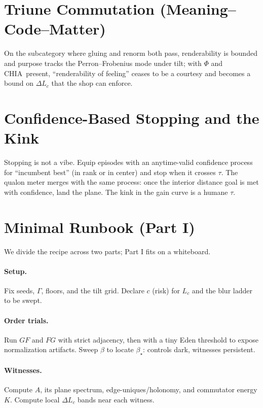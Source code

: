 \documentclass[11pt]{article}
\newcommand{\1}{\mathbf{1}}
\newcommand{\Guard}{\Gamma}
\newcommand{\Blur}{\beta}
\newcommand{\Lc}{L_c}
\newcommand{\Fop}{F}
\newcommand{\Gop}{G}
\newcommand{\FG}{\Fop\Gop}
\newcommand{\GF}{\Gop\Fop}
\newcommand{\Aanti}{A}
\newcommand{\PhiField}{\Phi}
\newcommand{\CHIA}{\textsc{CHIA}}
\begin{document}
\section{Triune Commutation (Meaning–Code–Matter)}
On the subcategory where gluing and renorm both pass, renderability is bounded and purpose tracks the Perron–Frobenius mode under tilt; with \(\PhiField\) and \CHIA\ present, ``renderability of feeling'' ceases to be a courtesy and becomes a bound on \(\Delta \Lc\) that the shop can enforce.

\section{Confidence-Based Stopping and the Kink}
Stopping is not a vibe. Equip episodes with an anytime-valid confidence process for ``incumbent best'' (in rank or in center) and stop when it crosses \(\tau\). The qualon meter merges with the same process: once the interior distance goal is met with confidence, land the plane. The kink in the gain curve is a humane \(\tau\).

\section{Minimal Runbook (Part I)}
We divide the recipe across two parts; Part I fits on a whiteboard.

\paragraph{Setup.} Fix seeds, \(\Guard\), floors, and the tilt grid. Declare \(c\) (risk) for \(\Lc\) and the blur ladder to be swept.

\paragraph{Order trials.} Run \(\GF\) and \(\FG\) with strict adjacency, then with a tiny Eden threshold to expose normalization artifacts. Sweep \(\Blur\) to locate \(\Blur_\star\): controls dark, witnesses persistent.

\paragraph{Witnesses.} Compute \(\Aanti\), its plane spectrum, edge-uniques/holonomy, and commutator energy \(K\). Compute local \(\Delta\Lc\) bands near each witness.
\end{document}
